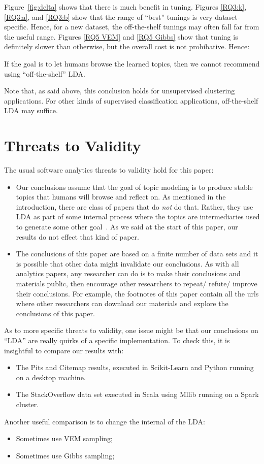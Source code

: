 \documentclass[10pt,conference]{IEEEtran}
\newcommand{\bi}{\begin{itemize}}
\newcommand{\ei}{\end{itemize}}
\theoremstyle{break}
\begin{document}
  Figure~\ref{fig:delta} shows that there is much benefit in tuning.
  Figures \ref{RQ3:k}, \ref{RQ3:a}, and \ref{RQ3:b} show that
  the range of ``best'' tunings is very dataset-specific. Hence, for a new dataset,
  the off-the-shelf tunings
  may often fall far from the useful range.
  Figures \ref{RQ5 VEM} and \ref{RQ5 Gibbs} show that tuning is definitely
  slower than otherwise, but the overall cost is not prohibative.
  Hence:
  \begin{lesson}
    If the goal is to let humans browse the learned topics,
    then we cannot recommend using  ``off-the-shelf'' LDA.
  \end{lesson}
  Note that, as said above, this conclusion holds for unsupervised clustering applications.
  For other kinds of supervised classification applications, off-the-shelf LDA may suffice.

 
 

\section{Threats to Validity}
\label{sect: validity}
The usual software analytics threats to validity hold for this paper:
\bi
\item
  Our conclusions assume that the goal of topic modeling is to produce stable topics
  that humans will browse and reflect on. As mentioned in the introduction, there are
  class of papers that do {\em not} do that. Rather, they use LDA as part of some internal
  process where the topics are intermediaries
  used to generate some other goal~\cite{chen2016topic}. As we said at the start
    of this paper, our results do not effect that kind of paper.
\item
The conclusions of this paper are based on a finite number of data sets and it is possible
that other data might invalidate our conclusions. As with all analytics papers, any researcher can do is to make their conclusions and materials public, then encourage
other researchers to repeat/ refute/ improve their conclusions. For example, the footnotes of this paper contain all the urls where other researchers can download
our materials and explore the conclusions of this paper.
\ei

As to more specific threats to validity, one issue might be that our conclusions
on ``LDA'' are really quirks of a specific implementation.
To check this, it is insightful to compare our results with:
\bi
\item The Pits and Citemap results, executed in Scikit-Learn and Python running on
  a desktop machine.
\item The StackOverflow data set executed in Scala using Mllib running on a Spark cluster.
  \ei
  Another useful comparison is to change the internal of the LDA:
  \bi
\item Sometimes use VEM sampling;
\item Sometimes use Gibbs sampling;
  \ei
\end{document}
